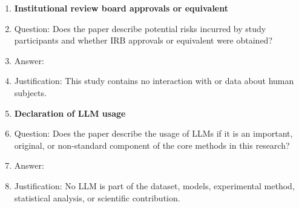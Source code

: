 \begin{enumerate}
\item \textbf{Institutional review board approvals or equivalent}
  \item[] Question: Does the paper describe potential risks incurred by study participants and whether IRB approvals or equivalent were obtained?
  \item[] Answer: \answerNA{}
  \item[] Justification: This study contains no interaction with or data about human subjects.

\item \textbf{Declaration of LLM usage}
  \item[] Question: Does the paper describe the usage of LLMs if it is an important, original, or non-standard component of the core methods in this research?
  \item[] Answer: \answerNA{}
  \item[] Justification: No LLM is part of the dataset, models, experimental method, statistical analysis, or scientific contribution.

\end{enumerate}
